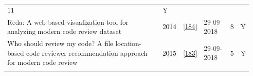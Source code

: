 \documentclass[]{book}
\begin{document}
\begin{longtable}[]{@{}llllll@{}}
\begin{minipage}[t]{0.07\columnwidth}
11\strut
\end{minipage} & \begin{minipage}[t]{0.08\columnwidth}\raggedright\strut
Y\strut
\end{minipage}\tabularnewline
\begin{minipage}[t]{0.47\columnwidth}\raggedright\strut
Reda: A web-based visualization tool for analyzing modern code review
dataset\strut
\end{minipage} & \begin{minipage}[t]{0.03\columnwidth}\raggedright\strut
2014\strut
\end{minipage} & \begin{minipage}[t]{0.13\columnwidth}\raggedright\strut
{[}\protect\hyperlink{ref-thongtanunam2014reda}{184}{]}\strut
\end{minipage} & \begin{minipage}[t]{0.06\columnwidth}\raggedright\strut
29-09-2018\strut
\end{minipage} & \begin{minipage}[t]{0.07\columnwidth}\raggedright\strut
8\strut
\end{minipage} & \begin{minipage}[t]{0.08\columnwidth}\raggedright\strut
Y\strut
\end{minipage}\tabularnewline
\begin{minipage}[t]{0.47\columnwidth}\raggedright\strut
Who should review my code? A file location-based code-reviewer
recommendation approach for modern code review\strut
\end{minipage} & \begin{minipage}[t]{0.03\columnwidth}\raggedright\strut
2015\strut
\end{minipage} & \begin{minipage}[t]{0.13\columnwidth}\raggedright\strut
{[}\protect\hyperlink{ref-thongtanunam2015should}{183}{]}\strut
\end{minipage} & \begin{minipage}[t]{0.06\columnwidth}\raggedright\strut
29-09-2018\strut
\end{minipage} & \begin{minipage}[t]{0.07\columnwidth}\raggedright\strut
5\strut
\end{minipage} & \begin{minipage}[t]{0.08\columnwidth}\raggedright\strut
Y\strut
\end{minipage}\tabularnewline
\begin{minipage}[t]{0.47\columnwidth}\raggedright\strut

\end{minipage}
\end{longtable}
\end{document}
